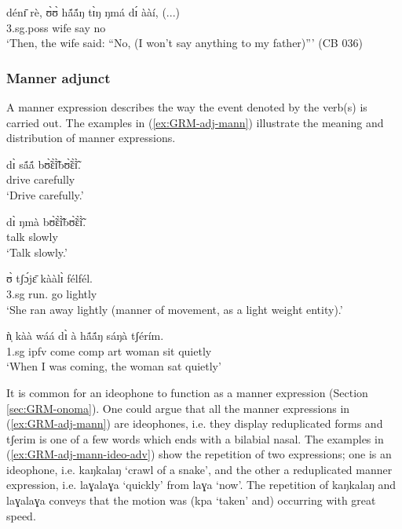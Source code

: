 \begin{exe}
\begin{exe}
\begin{exe}
\ea\label{ex:GRM-adj-temp-thereupon}
\gll dénɪ̄   rè,     ʊ̀ʊ̀      hã́ã́ŋ   tɪ̀ŋ 
ŋmá   dɪ́  ààí, (...)\\
 {\advt}   {\foc}  {\sc 3.sg.poss}  wife  {\art}  say   {\comp} 
no {}\\
  `Then, the wife said: ``No, (I won't
say
anything to my father)'''  (CB 036)
\z




\subsubsection{Manner adjunct}
\label{sec:GRM-manner-adv}

A manner  expression describes the way the event denoted by
the verb(s) is carried out. The examples in (\ref{ex:GRM-adj-mann}) illustrate
the meaning and distribution of  manner expressions.


\ea\label{ex:GRM-adj-mann}


\ea\label{ex:GRM-adj-mann-carefully}
\gll dɪ̀ sã́ã́ bʊ̃̀ɛ̃̀ɪ̃̀bʊ̃̀ɛ̃̀ɪ̃̀.\\
{\comp} drive {carefully}\\
\glt `Drive carefully.'

\ex\label{ex:GRM-adj-mann-slowly}
\gll dɪ̀ ŋmà bʊ̃̀ɛ̃̀ɪ̃̀bʊ̃̀ɛ̃̀ɪ̃̀.\\
{\comp} talk {slowly}\\
\glt `Talk slowly.'

\ex\label{ex:GRM-adj-mann-lighly}
\gll ʊ̀ tʃɔ́jɛ̄ kààlɪ̀ félfél.\\
 {\sc 3.sg} run.{\pfv} go {lightly}\\
\glt `She ran away lightly (manner of movement, as a light weight
entity).'

\ex\label{ex:GRM-adj-mann-silently}
\gll  ǹ̩ kàà wáá dɪ̀ à   hã́ã́ŋ  sáŋà   tʃérím.\\
{\sc 1.sg} {\sc ipfv} come {\sc comp} {\sc art} woman sit quietly\\
\glt `When I was coming, the woman sat quietly' 

\z 
 \z

It is common for an ideophone to function as a manner expression 
 (Section \ref{sec:GRM-onoma}). One could argue that  all the manner 
expressions in
(\ref{ex:GRM-adj-mann}) are ideophones, i.e. they display reduplicated forms
and {\sls tʃerim} is one of a few words which ends with a bilabial nasal. The
examples in (\ref{ex:GRM-adj-mann-ideo-adv}) show the repetition of two
expressions; one is an ideophone, i.e. {\sls kaŋkalaŋ} `crawl of 
a 
snake', and the
other  a  reduplicated  manner expression,  i.e. {\sls 
laɣalaɣa} 
`quickly' from {\sls laɣa} 
`now'. The
repetition of {\sls kaŋkalaŋ} and {\sls  laɣalaɣa} conveys that the motion was
({\sls kpa} `taken'  and) occurring with great speed.


\end{exe}
\end{exe}
\end{exe}
